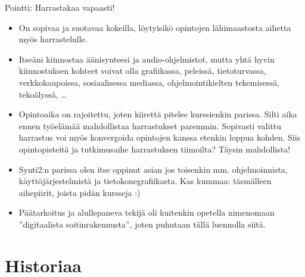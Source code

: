 \documentclass[pdf,9pt,handout]{beamer}
\begin{document}
\begin{frame}{Pointti: Harrastakaa vapaasti!}
  \begin{itemize}
    \item
  On sopivaa ja suotavaa kokeilla, löytyisikö opintojen lähimaastosta
  aihetta myös harrastelulle.

  \item Itseäni kiinnostaa äänisynteesi ja audio-ohjelmistot, mutta
    yhtä hyvin kiinnostuksen kohteet voivat olla grafiikassa,
    peleissä, tietoturvassa, verkkokaupoissa, sosiaalisessa mediassa,
    ohjelmointikielten tekemisessä, tekoälyssä, \ldots

\item
  Opintoaika on rajoitettu, joten kiirettä pitelee kurssienkin
  parissa. Silti aika ennen työelämää mahdollistaa harrastukset
  paremmin. Sopivasti valittu harrastus voi myös konvergoida opintojen
  kanssa etenkin loppua kohden. Siis opintopisteitä ja tutkimusaihe
  harrastuksen tiimoilta? Täysin mahdollista!

\item
  Synti2:n parissa olen itse oppinut asian jos toisenkin
  mm. ohjelmoinnista, käyttöjärjestelmistä ja
  tietokonegrafiikasta. Kas kummaa: täsmälleen aihepiirit, joista
  pidän kursseja :)

\item
  Päätarkoitus ja alullepaneva tekijä oli kuitenkin opetella
  nimenomaan ''digitaalista soitinrakennusta'', joten puhutaan tällä
  luennolla siitä.
\end{itemize}
\end{frame}

\section{Historiaa}
\end{document}
